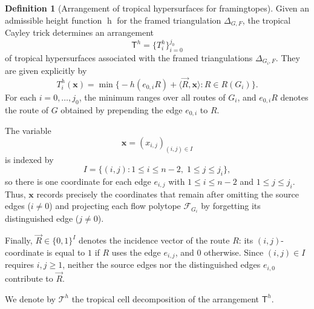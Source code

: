 \documentclass[12pt, reqno]{amsart}
\newcommand{\h}{\operatorname{h}}
\theoremstyle{plain}
\theoremstyle{definition}
\newtheorem{definition}[theorem]{Definition}
\numberwithin{equation}{section}
\begin{document}
\begin{definition}[Arrangement of tropical hypersurfaces for framingtopes]
\label{def_framingtopes_arrangement} Given an admissible height function $\h$ for the framed triangulation $\Delta_{G,F}$, the tropical Cayley trick determines an arrangement
\[
\mathsf{T}^h=\{T_i^h\}_{i=0}^{j_0}
\]
of tropical hypersurfaces associated with the framed triangulations $\Delta_{G_i,F}$. They are given explicitly by
\begin{equation}\label{eq_framingtope_trop_hypersurfaces}
T_i^h(\mathbf{x}) = \min\bigl\{ -h(e_{0,i}R)+\langle\vec{R},\mathbf{x}\rangle : R\in R(G_i) \bigr\}.
\end{equation}
For each $i=0,\dots,j_0$, the minimum ranges over all routes of $G_i$, and $e_{0,i}R$ denotes the route of $G$ obtained by prepending the edge $e_{0,i}$ to $R$.

The variable
\[
\mathbf{x}=(x_{i,j})_{(i,j)\in I}
\]
is indexed by
\[
I=\{(i,j):1\le i\le n-2,\;1\le j\le j_i\},
\]
so there is one coordinate for each edge $e_{i,j}$ with $1\le i\le n-2$ and $1\le j\le j_i$. Thus, $\mathbf{x}$ records precisely the coordinates that remain after omitting the source edges ($i\neq 0$) and projecting each flow polytope $\mathcal{F}_{G_i}$ by forgetting its distinguished edge ($j\neq 0$).

Finally, $\vec{R}\in\{0,1\}^{I}$ denotes the incidence vector of the route $R$: its $(i,j)$-coordinate is equal to $1$ if $R$ uses the edge $e_{i,j}$, and $0$ otherwise. Since $(i,j)\in I$ requires $i,j\ge1$, neither the source edges nor the distinguished edges $e_{i,0}$ contribute to $\vec{R}$.

We denote by $\mathscr{T}^h$ the tropical cell decomposition of the arrangement $\mathsf{T}^h$.
\end{definition}
\end{document}
